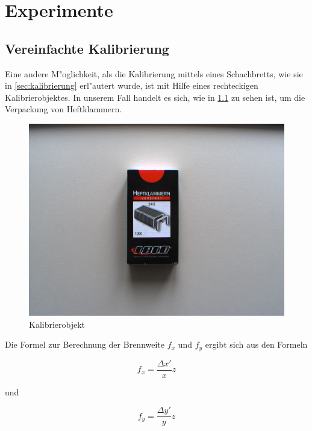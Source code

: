 \chapter{Experimente}
\label{cha:experimente}

\section{Vereinfachte Kalibrierung}
\label{sec:vereinfachtekalib}

Eine andere M"oglichkeit, als die Kalibrierung mittels eines Schachbretts, wie sie in \ref{sec:kalibrierung} erl"autert wurde, ist mit Hilfe eines rechteckigen Kalibrierobjektes. In unserem Fall handelt es sich, wie in \ref{fig:klammern} zu sehen ist, um die Verpackung von Heftklammern.
 
\begin{figure}[H]
	\includegraphics[scale=0.5]{bilder/experimentcalib}
	\caption[Kalibrierobjekt]{Kalibrierobjekt}
	\label{fig:klammern}
\end{figure}

\newpage

\noindent Die Formel zur Berechnung der Brennweite $f_x$ und $f_y$ ergibt sich aus den Formeln

\begin{equation}
f_x=\frac{\Delta x'}{x}z
\end{equation}

und

\begin{equation}
f_y=\frac{\Delta y'}{y}z
\end{equation}

